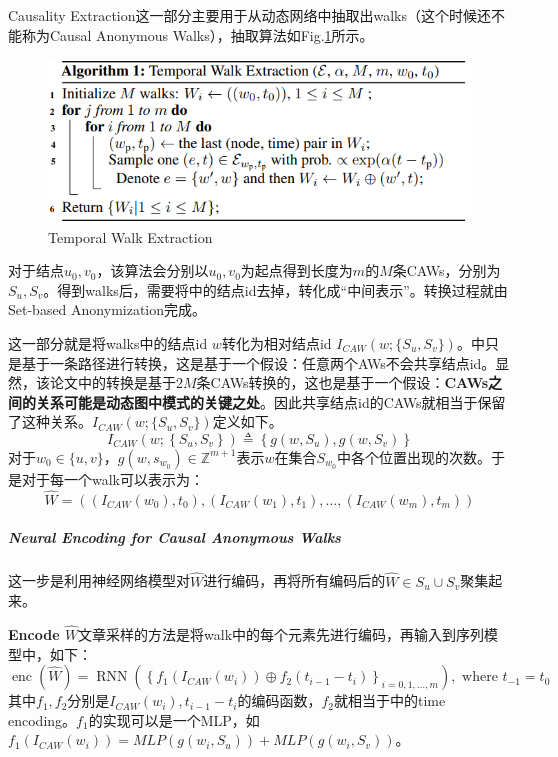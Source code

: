 Causality Extraction这一部分主要用于从动态网络中抽取出walks（这个时候还不能称为Causal Anonymous Walks），抽取算法如Fig.\ref{fig:caw-walk-eatraction}所示。
\begin{figure}[h]
	\centering
	\includegraphics[width=.75\textwidth]{pics/CAW-Walk-Extraction.png}
	\caption{Temporal Walk Extraction}
	\label{fig:caw-walk-eatraction}
\end{figure}
对于结点$u_0, v_0$，该算法会分别以$u_0, v_0$为起点得到长度为$m$的$M$条CAWs，分别为$S_u, S_v$。得到walks后，需要将中的结点id去掉，转化成“中间表示”。转换过程就由Set-based Anonymization完成。

这一部分就是将walks中的结点id $w$转化为相对结点id $I_{CAW}(w; \{S_u,S_v\})$。\cite{micali2016reconstructing}中只是基于一条路径进行转换，这是基于一个假设：任意两个AWs不会共享结点id。显然，该论文中的转换是基于$2M$条CAWs转换的，这也是基于一个假设：\textbf{CAWs之间的关系可能是动态图中模式的关键之处}。因此共享结点id的CAWs就相当于保留了这种关系。$I_{CAW}(w; \{S_u,S_v\})$定义如下。
$$
I_{C A W}\left(w ;\left\{S_{u}, S_{v}\right\}\right) \triangleq\left\{g\left(w, S_{u}\right), g\left(w, S_{v}\right)\right\}
$$
对于$w_0 \in \{u, v\}$，$g(w, s_{w_0}) \in \mathbb{Z}^{m+1}$表示$w$在集合$S_{w_0}$中各个位置出现的次数。于是对于每一个walk可以表示为：
$$
\hat{W}=\left(\left(I_{C A W}\left(w_{0}\right), t_{0}\right),\left(I_{C A W}\left(w_{1}\right), t_{1}\right), \ldots,\left(I_{C A W}\left(w_{m}\right), t_{m}\right)\right)
$$

\subparagraph{Neural Encoding for Causal Anonymous Walks}
这一步是利用神经网络模型对$\hat{W}$进行编码，再将所有编码后的$\hat{W} \in S_u \cup S_v$聚集起来。

\par{\textbf{Encode $\hat{W}$}}文章采样的方法是将walk中的每个元素先进行编码，再输入到序列模型中，如下：
$$
\operatorname{enc}(\hat{W})=\operatorname{RNN}\left(\left\{f_{1}\left(I_{C A W}\left(w_{i}\right)\right) \oplus f_{2}\left(t_{i-1}-t_{i}\right)\right\}_{i=0,1, \ldots, m}\right), \text { where } t_{-1}=t_{0}
$$
其中$f_1, f_2$分别是$I_{CAW}(w_i), t_{i-1} - t_i$的编码函数，$f_2$就相当于\cite{tgat_iclr20}中的time encoding。$f_1$的实现可以是一个MLP，如$f_1(I_{CAW}(w_i)) = MLP(g(w_i, S_u)) + MLP(g(w_i, S_v))$。

